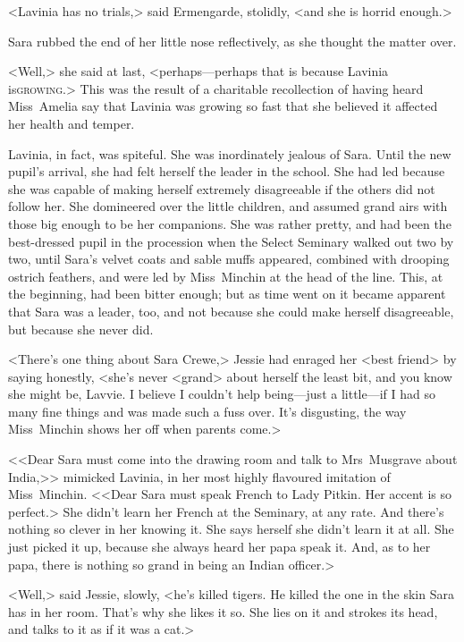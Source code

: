 <Lavinia has no trials,> said Ermengarde, stolidly, <and she is horrid enough.>

Sara rubbed the end of her little nose reflectively, as she thought the matter over.

<Well,> she said at last, <perhaps—perhaps that is because Lavinia is\textsc{growing}.> This was the result of a charitable recollection of having heard Miss~Amelia say that Lavinia was growing so fast that she believed it affected her health and temper.

Lavinia, in fact, was spiteful. She was inordinately jealous of Sara. Until the new pupil's arrival, she had felt herself the leader in the school. She had led because she was capable of making herself extremely disagreeable if the others did not follow her. She domineered over the little children, and assumed grand airs with those big enough to be her companions. She was rather pretty, and had been the best-dressed pupil in the procession when the Select Seminary walked out two by two, until Sara's velvet coats and sable muffs appeared, combined with drooping ostrich feathers, and were led by Miss~Minchin at the head of the line. This, at the beginning, had been bitter enough; but as time went on it became apparent that Sara was a leader, too, and not because she could make herself disagreeable, but because she never did.

<There's one thing about Sara Crewe,> Jessie had enraged her <best friend> by saying honestly, <she's never <grand> about herself the least bit, and you know she might be, Lavvie. I believe I couldn't help being—just a little—if I had so many fine things and was made such a fuss over. It's disgusting, the way Miss~Minchin shows her off when parents come.>

<<Dear Sara must come into the drawing room and talk to Mrs~Musgrave about India,>> mimicked Lavinia, in her most highly flavoured imitation of Miss~Minchin. <<Dear Sara must speak French to Lady Pitkin. Her accent is so perfect.> She didn't learn her French at the Seminary, at any rate. And there's nothing so clever in her knowing it. She says herself she didn't learn it at all. She just picked it up, because she always heard her papa speak it. And, as to her papa, there is nothing so grand in being an Indian officer.>

<Well,> said Jessie, slowly, <he's killed tigers. He killed the one in the skin Sara has in her room. That's why she likes it so. She lies on it and strokes its head, and talks to it as if it was a cat.>

